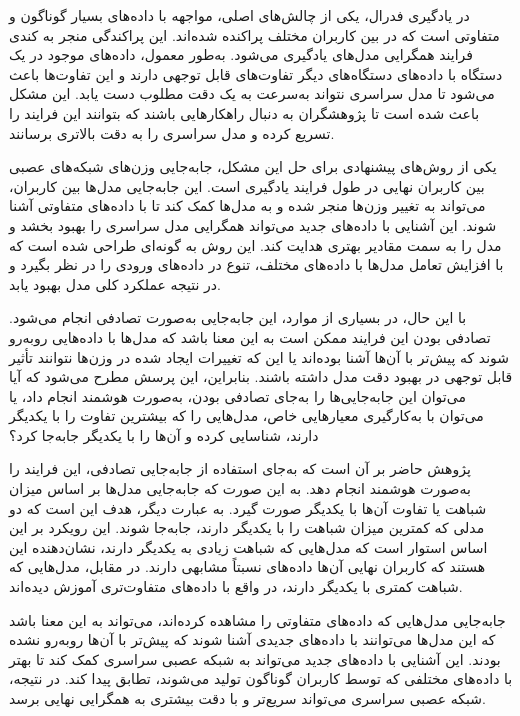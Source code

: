 در یادگیری فدرال، یکی از چالش‌های اصلی، مواجهه با داده‌های بسیار گوناگون و متفاوتی است که در بین کاربران مختلف پراکنده شده‌اند. این پراکندگی منجر به کندی فرایند همگرایی مدل‌های یادگیری می‌شود. به‌طور معمول، داده‌های موجود در یک دستگاه با داده‌های دستگاه‌های دیگر تفاوت‌های قابل توجهی دارند و این تفاوت‌ها باعث می‌شود تا مدل سراسری نتواند به‌سرعت به یک دقت مطلوب دست یابد. این مشکل باعث شده است تا پژوهشگران به دنبال راهکارهایی باشند که بتوانند این فرایند را تسریع کرده و مدل سراسری را به دقت بالاتری برسانند.

یکی از روش‌های پیشنهادی برای حل این مشکل، جابه‌جایی وزن‌های شبکه‌های عصبی بین کاربران نهایی در طول فرایند یادگیری است. این جابه‌جایی مدل‌ها بین کاربران، می‌تواند به تغییر وزن‌ها منجر شده و به مدل‌ها کمک کند تا با داده‌های متفاوتی آشنا شوند. این آشنایی با داده‌های جدید می‌تواند همگرایی مدل سراسری را بهبود بخشد و مدل را به سمت مقادیر بهتری هدایت کند. این روش به گونه‌ای طراحی شده است که با افزایش تعامل مدل‌ها با داده‌های مختلف، تنوع در داده‌های ورودی را در نظر بگیرد و در نتیجه عملکرد کلی مدل بهبود یابد.

با این حال، در بسیاری از موارد، این جابه‌جایی به‌صورت تصادفی انجام می‌شود. تصادفی بودن این فرایند ممکن است به این معنا باشد که مدل‌ها با داده‌هایی روبه‌رو شوند که پیش‌تر با آن‌ها آشنا بوده‌اند یا این که تغییرات ایجاد شده در وزن‌ها نتوانند تأثیر قابل‌ توجهی در بهبود دقت مدل داشته باشند. بنابراین، این پرسش مطرح می‌شود که آیا می‌توان این جابه‌جایی‌ها را به‌جای تصادفی بودن، به‌صورت هوشمند انجام داد، یا می‌توان با به‌کارگیری معیارهایی خاص، مدل‌هایی را که بیشترین تفاوت را با یکدیگر دارند، شناسایی کرده و آن‌ها را با یکدیگر جابه‌جا کرد؟

پژوهش حاضر بر آن است که به‌جای استفاده از جابه‌جایی تصادفی، این فرایند را به‌صورت هوشمند انجام دهد. به این صورت که جابه‌جایی مدل‌ها بر اساس میزان شباهت یا تفاوت آن‌ها با یکدیگر صورت گیرد. به عبارت دیگر، هدف این است که دو مدلی که کمترین میزان شباهت را با یکدیگر دارند، جابه‌جا شوند. این رویکرد بر این اساس استوار است که مدل‌هایی که شباهت زیادی به یکدیگر دارند، نشان‌دهنده این هستند که کاربران نهایی آن‌ها داده‌های نسبتاً مشابهی دارند. در مقابل، مدل‌هایی که شباهت کمتری با یکدیگر دارند، در واقع با داده‌های متفاوت‌تری آموزش دیده‌اند.

جابه‌جایی مدل‌هایی که داده‌های متفاوتی را مشاهده کرده‌اند، می‌تواند به این معنا باشد که این مدل‌ها می‌توانند با داده‌های جدیدی آشنا شوند که پیش‌تر با آن‌ها روبه‌رو نشده بودند. این آشنایی با داده‌های جدید می‌تواند به شبکه عصبی سراسری کمک کند تا بهتر با داده‌های مختلفی که توسط کاربران گوناگون تولید می‌شوند، تطابق پیدا کند. در نتیجه، شبکه عصبی سراسری می‌تواند سریع‌تر و با دقت بیشتری به همگرایی نهایی برسد.


